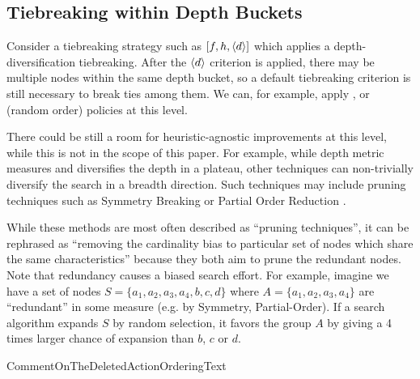 \subsection{Tiebreaking within Depth Buckets}

Consider a tiebreaking strategy such as $[f,h,{\left<d\right>}]$ which applies a depth-diversification tiebreaking.
After the ${\left<d\right>}$ criterion is applied, 
there may be multiple nodes within the same depth bucket, so a
default tiebreaking criterion is still necessary to break ties among them.
We can, for example, apply \lifo, \fifo or \ro (random order) policies
at this level.

There could be still a room for heuristic-agnostic improvements at
this level,  while this is not in the scope of this paper.
For example, while depth metric measures and diversifies the depth in a plateau,
other techniques can non-trivially diversify the search in a breadth direction.
Such techniques may include pruning techniques such as 
Symmetry Breaking \cite{Fox1998,pochter2011exploiting,domshlak2013symmetry}
or Partial Order Reduction \cite{hall2013faster,wehrle2013relative}.

While these methods are most often described as ``pruning techniques'',
it can be rephrased as ``removing the cardinality bias to particular set
of nodes which share the same characteristics'' because they both aim to
prune the redundant nodes. Note that redundancy causes a biased 
search effort. For example, imagine we have a
set of nodes $S=\{a_1, a_2, a_3, a_4, b, c, d\}$ where
$A=\{a_1, a_2, a_3, a_4\}$ are ``redundant'' in some measure (e.g. by Symmetry,
Partial-Order). 
If a search algorithm expands $S$ by random selection, it favors the
group $A$ by giving a 4 times larger chance of expansion than $b$,
$c$ or $d$.

CommentOnTheDeletedActionOrderingText


